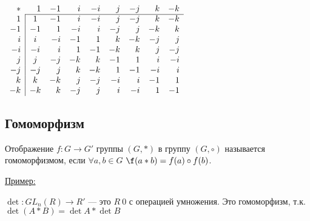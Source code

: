 \documentclass[a4paper]{article}
\theoremstyle{named}
\begin{document}
\begin{colloq}
\begin{definition}
            \(\begin{array}{rrrrrrrrr}
                  * & 1 & -1 & i & -i & j & -j & k & -k \\ \cline{2-9}
                  1 & \multicolumn{1}{|c}{1}   & -1 & i & -i & j & -j & k & -k \\
                  -1 & \multicolumn{1}{|c}{-1} & 1 & -i & i & -j & j & -k & k \\
                  i & \multicolumn{1}{|c}{i}   & -i & -1 & 1 & k & -k & -j & j \\
                  -i & \multicolumn{1}{|c}{-i} & i & 1 & -1 & -k & k & j & -j \\
                  j & \multicolumn{1}{|c}{j}   & -j & -k & k & -1 & 1 & i & -i \\
                  -j & \multicolumn{1}{|c}{-j} & j & k & -k & 1 & -1 & -i & i \\
                  k & \multicolumn{1}{|c}{k}   & -k & j & -j & -i & i & -1 & 1 \\
                  -k & \multicolumn{1}{|c}{-k} & k & -j & j & i & -i & 1 & -1
            \end{array}\)
        \end{definition}

        \newline

        \subsection{Гомоморфизм}

        Отображение \(f:G \to G'\) группы \((G, *)\) в группу \((G,\circ)\) называется гомоморфизмом,
        если \(\forall a, b \in G\) \(\f(a * b) = f(a) \circ f(b)\).

        \underline{Пример:}

        \(\det : GL_n(R) \to R'\) — это \(R \ {0}\) с операцией умножения.
        Это гомоморфизм, т.к. \(\det (A * B) = \det A * \det B\)

    \end{colloq}
\end{document}
